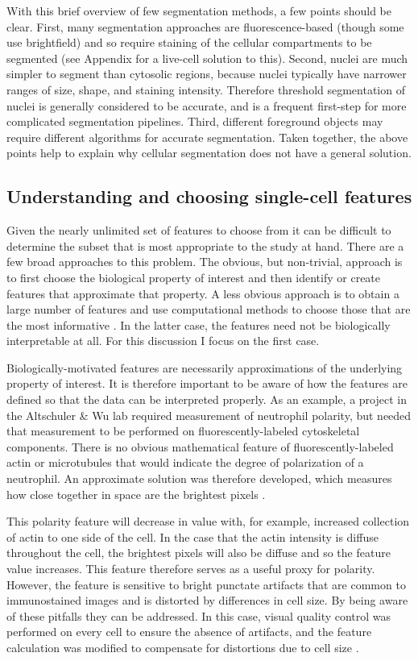 With this brief overview of few segmentation methods, a
few points should be clear. First, many segmentation
approaches are fluorescence-based (though some use
brightfield) and so require staining of the cellular
compartments to be segmented (see Appendix  for a live-cell
solution to this). Second, nuclei are much simpler
to segment than cytosolic regions, because nuclei typically
have narrower ranges of size, shape, and staining intensity.
Therefore threshold segmentation of
nuclei is generally considered to be accurate, and is
a frequent first-step for more complicated segmentation
pipelines. Third, different foreground objects may
require different algorithms for accurate segmentation.
Taken together, the above points help to explain why cellular
segmentation does not have a general solution.



\subsection{Understanding and choosing single-cell features}

Given the nearly unlimited set of features to choose from
it can be difficult to determine the subset that is most
appropriate to the study at hand. There are a few broad
approaches to this problem. The obvious, but non-trivial, approach is to
first choose the biological property of interest and then
identify or create features that approximate that property.
A less obvious approach is to obtain a large number of
features and use computational methods to choose those that
are the most informative \cite{Singh2010}.
In the latter case, the features need
not be biologically interpretable at all. For this discussion
I focus on the first case.


Biologically-motivated features are necessarily approximations
of the underlying property of interest. It is therefore important
to be aware of how the features are defined so that the data
can be interpreted properly. As an example, a project in the
Altschuler \& Wu lab required measurement of neutrophil polarity, but
needed that measurement to be performed on fluorescently-labeled
cytoskeletal components. There is no obvious mathematical
feature of fluorescently-labeled actin or microtubules that would indicate the
degree of polarization of a neutrophil. An approximate solution was
therefore developed, which measures how close together in space are the brightest
pixels \cite{Ku2010,Ku2012}.


This polarity feature will decrease in value with, for example, 
increased collection of actin to one side of the cell.
In the case that the actin intensity is diffuse throughout
the cell, the brightest pixels will also be
diffuse and so the feature value increases.
This feature therefore serves as a useful proxy for polarity. However,
the feature is sensitive to bright punctate artifacts that
are common to immunostained images and is distorted by differences in
cell size. By being aware of these pitfalls they can
be addressed. In this case, visual quality control was performed
on every cell to ensure
the absence of artifacts, and the feature calculation was modified to compensate
for distortions due to cell size \cite{Ku2010,Ku2012}.


